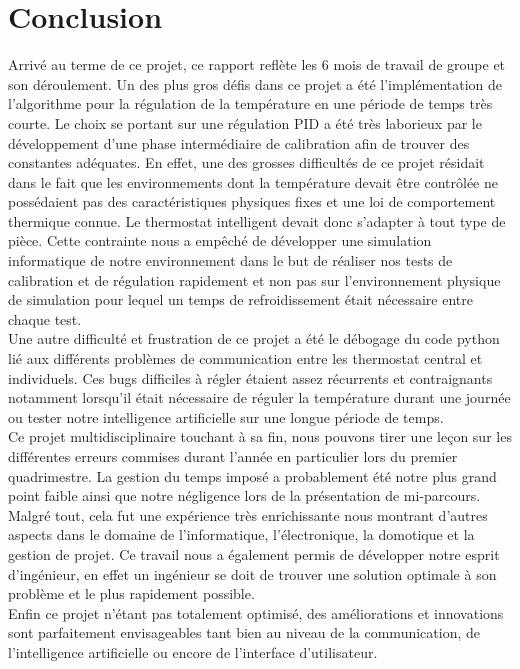\documentclass[12pt]{report}
\begin{document}
\chapter{Conclusion}

Arrivé au terme de ce projet, ce rapport reflète les 6 mois de travail de groupe et son déroulement. Un des plus gros défis dans ce projet a été l'implémentation de l'algorithme pour la régulation de la température en une période de temps très courte. Le choix se portant sur une régulation PID a été très laborieux par le développement d'une phase intermédiaire de calibration afin de trouver des constantes adéquates. En effet, une des grosses difficultés de ce projet résidait dans le fait que les environnements dont la température devait être contrôlée ne possédaient pas des caractéristiques physiques fixes et une loi de comportement thermique connue. Le thermostat intelligent devait donc s'adapter à tout type de pièce. Cette contrainte nous a empêché de développer une simulation informatique de notre environnement dans le but de réaliser nos tests de calibration et de régulation rapidement et non pas sur l'environnement physique de simulation pour lequel un temps de refroidissement était nécessaire entre chaque test.\\
Une autre difficulté et frustration de ce projet a été le débogage du code python lié aux différents problèmes de communication entre les thermostat central et individuels. Ces bugs difficiles à régler étaient assez récurrents et contraignants notamment lorsqu'il était nécessaire de réguler la température durant une journée ou tester notre intelligence artificielle sur une longue période de temps.\\
Ce projet multidisciplinaire touchant à sa fin, nous pouvons tirer une leçon sur les différentes erreurs commises durant l'année en particulier lors du premier quadrimestre. La gestion du temps imposé a probablement été notre plus grand point faible ainsi que notre négligence lors de la présentation de mi-parcours.\\
Malgré tout, cela fut une expérience très enrichissante nous montrant d'autres aspects dans le domaine de l'informatique, l'électronique, la domotique et la gestion de projet. Ce travail nous a également permis de développer notre esprit d'ingénieur, en effet un ingénieur se doit de trouver une solution optimale à son problème et le plus rapidement possible.\\
Enfin ce projet n'étant pas totalement optimisé, des améliorations et innovations sont parfaitement envisageables tant bien au niveau de la communication, de l'intelligence artificielle ou encore de l'interface d'utilisateur.
\end{document}
